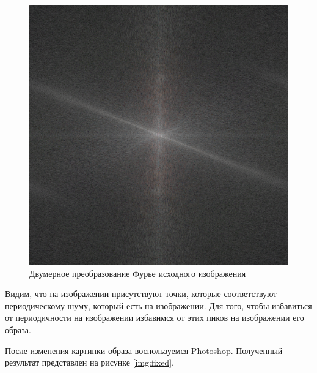 \begin{figure}[ht!]
    \centering
    \includegraphics[width=\textwidth]{abs_fourier_log.png}
    \caption{Двумерное преобразование Фурье исходного изображения}
    \label{img:src_fft}
\end{figure}

Видим, что на изображении присутствуют точки, которые соответствуют периодическому шуму, который есть на изображении. 
Для того, чтобы избавиться от периодичности на изображении избавимся от этих пиков на изображении его образа. 

После изменения картинки образа воспользуемся Photoshop. Полученный результат представлен на рисунке \ref{img:fixed}.

